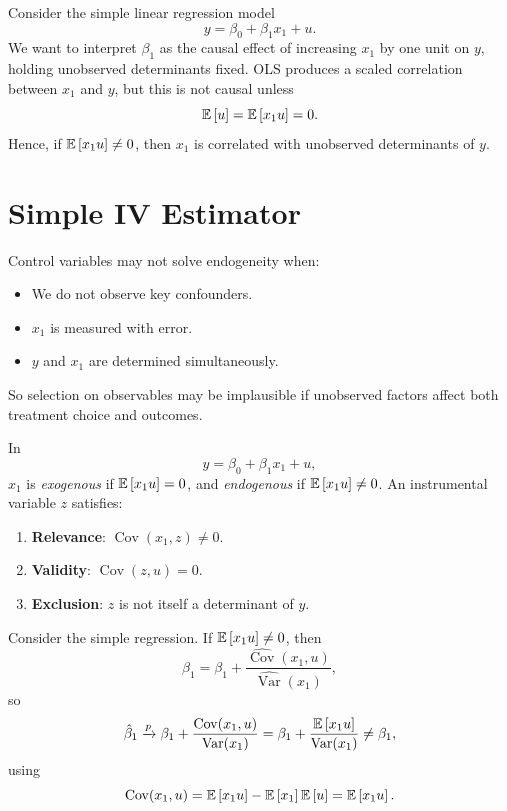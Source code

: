 
Consider the simple linear regression model \[
	y = \beta_0 + \beta_1 x_1 + u
.\]
We want to interpret $\beta_1$ as the causal effect of increasing $x_1$ by one unit on $y$, holding unobserved determinants fixed. OLS produces a scaled correlation between $x_1$ and $y$, but this is not causal unless \[
	\mathbb{E}\left[u\right] = \mathbb{E}\left[x_1 u\right] = 0
.\]
Hence, if $\mathbb{E}\left[x_1 u\right] \ne 0$, then $x_1$ is correlated with unobserved determinants of $y$.

\section{Simple IV Estimator}

\begin{remark}
	Control variables may not solve endogeneity when:
	\begin{itemize}
		\item We do not observe key confounders.
		\item $x_1$ is measured with error.
		\item $y$ and $x_1$ are determined simultaneously.
	\end{itemize}
	So selection on observables may be implausible if unobserved factors affect both treatment choice and outcomes.
\end{remark}

\begin{definition}
	In \[
		y = \beta_0 + \beta_1 x_1 + u
	,\]
	$x_1$ is \emph{exogenous} if $\mathbb{E}\left[x_1 u\right] = 0$, and \emph{endogenous} if $\mathbb{E}\left[x_1 u\right] \ne 0$. An instrumental variable $z$ satisfies:
	\begin{enumerate}[label=(\roman*)]
		\item \textbf{Relevance}: $\operatorname{Cov}(x_1, z) \ne 0$.
		\item \textbf{Validity}: $\operatorname{Cov}(z, u) = 0$.
		\item \textbf{Exclusion}: $z$ is not itself a determinant of $y$.
	\end{enumerate}
\end{definition}

\begin{proposition}
	Consider the simple regression.
	If $\mathbb{E}\left[x_1 u\right] \ne 0$, then \[
		\hat{\beta}_1 = \beta_1 + \frac{\widehat{\operatorname{Cov}}(x_1, u)}{\widehat{\operatorname{Var}}(x_1)}
	,\]
	so \[
		\hat{\beta}_1 \xrightarrow{p} \beta_1 + \frac{\operatorname{Cov}(x_1, u)}{\operatorname{Var}(x_1)} = \beta_1 + \frac{\mathbb{E}\left[x_1 u\right]}{\operatorname{Var}(x_1)} \ne \beta_1
	,\]
	using \[
		\operatorname{Cov}(x_1, u) = \mathbb{E}\left[x_1 u\right] - \mathbb{E}\left[x_1\right]\mathbb{E}\left[u\right] = \mathbb{E}\left[x_1 u\right]
	.\]
\end{proposition}

